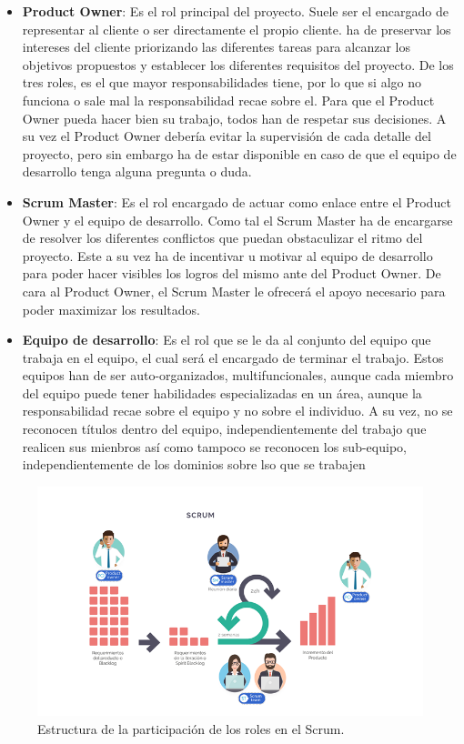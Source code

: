 \begin{itemize}
	\item \textbf{Product Owner}: Es el rol principal del proyecto. Suele ser el encargado de representar al cliente o ser directamente el propio cliente. ha de preservar los intereses del cliente priorizando las diferentes tareas para alcanzar los objetivos propuestos y establecer los diferentes requisitos del proyecto. De los tres roles, es el que mayor responsabilidades tiene, por lo que si algo no funciona o sale mal la responsabilidad recae sobre el. Para que el Product Owner pueda hacer bien su trabajo, todos han de respetar sus decisiones. A su vez el Product Owner debería evitar la supervisión de cada detalle del proyecto, pero sin embargo ha de estar disponible en caso de que el equipo de desarrollo tenga alguna pregunta o duda.
	\item \textbf{Scrum Master}: Es el rol encargado de actuar como enlace entre el Product Owner y el equipo de desarrollo. Como tal el Scrum Master ha de encargarse de resolver los diferentes conflictos que puedan obstaculizar el ritmo del proyecto. Este a su vez ha de incentivar u motivar al equipo de desarrollo para poder hacer visibles los logros del mismo ante del Product Owner. De cara al Product Owner, el Scrum Master le ofrecerá el apoyo necesario para poder maximizar los resultados.
	\item \textbf{Equipo de desarrollo}: Es el rol que se le da al conjunto del equipo que trabaja en el equipo, el cual será el encargado de terminar el trabajo. Estos equipos han de ser auto-organizados, multifuncionales, aunque cada miembro del equipo puede tener habilidades especializadas en un área, aunque la responsabilidad recae sobre el equipo y no sobre el individuo. A su vez, no se reconocen títulos dentro del equipo, independientemente del trabajo que realicen sus mienbros así como tampoco se reconocen  los sub-equipo, independientemente de los dominios sobre lso que se trabajen
\end{itemize}

\begin{figure}[H]
	\centering
	\includegraphics[width=1\textwidth]{img/roles-scrum}
	\caption{Estructura de la participación de los roles en el Scrum.}
	\label{fig:roles-scrum}
\end{figure}

